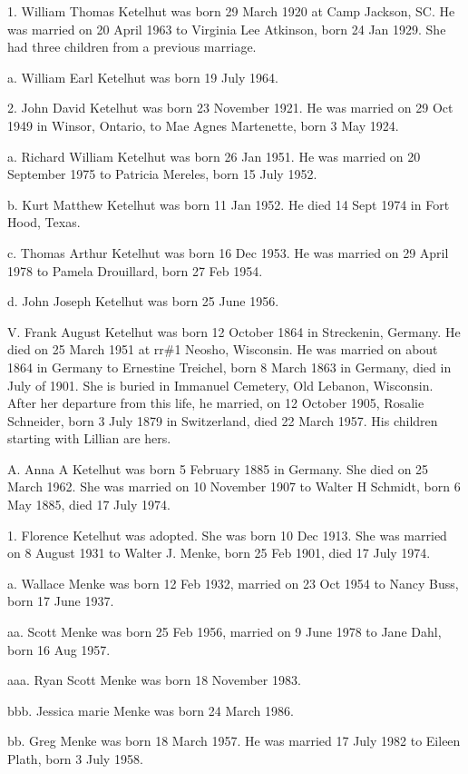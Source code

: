 \documentclass[a4paper]{article}
\begin{document}
1. William Thomas Ketelhut was born 29 March 1920 at Camp Jackson, SC.  He was married on 20 April 1963 to Virginia Lee Atkinson, born 24 Jan 1929.  She had three children from a previous marriage.  

a. William Earl Ketelhut was born 19 July 1964.

2. John David Ketelhut was born 23 November 1921.  He was married on 29 Oct 1949 in Winsor, Ontario, to Mae Agnes Martenette, born 3 May 1924.

a. Richard William Ketelhut was born 26 Jan 1951.  He was married on 20 September 1975 to Patricia Mereles, born 15 July 1952.

b. Kurt Matthew Ketelhut was born 11 Jan 1952.  He died 14 Sept 1974 in Fort Hood, Texas.  

c. Thomas Arthur Ketelhut was born 16 Dec 1953.  He was married on 29 April 1978 to Pamela Drouillard, born 27 Feb 1954.

d. John Joseph Ketelhut was born 25 June 1956.

V. Frank August Ketelhut was born 12 October 1864 in Streckenin, Germany.  He died on 25 March 1951 at rr\#1 Neosho, Wisconsin.  He was married on about 1864 in Germany to Ernestine Treichel, born 8 March 1863 in Germany, died in July of 1901.  She is buried in Immanuel Cemetery,  Old Lebanon, Wisconsin.  After her departure from this life, he married, on 12 October 1905, Rosalie Schneider, born 3 July 1879 in Switzerland, died 22 March 1957.  His children starting with Lillian are hers.

A. Anna A Ketelhut was born 5 February 1885 in Germany.  She died on 25 March 1962. She was married on 10 November 1907 to Walter H Schmidt, born 6 May 1885, died 17 July 1974.

1. Florence Ketelhut was adopted.  She was born 10 Dec 1913.  She was married on 8 August 1931 to Walter J. Menke, born 25 Feb 1901, died 17 July 1974.

a. Wallace Menke was born 12 Feb 1932, married on 23 Oct 1954 to Nancy Buss, born 17 June 1937.

aa. Scott Menke was born 25 Feb 1956, married on 9 June 1978 to Jane Dahl, born 16 Aug 1957.

aaa. Ryan Scott Menke was born 18 November 1983.

bbb. Jessica marie Menke was born 24 March 1986.

bb. Greg Menke was born 18 March 1957.  He was married 17 July 1982 to Eileen Plath, born 3 July 1958.
\end{document}
